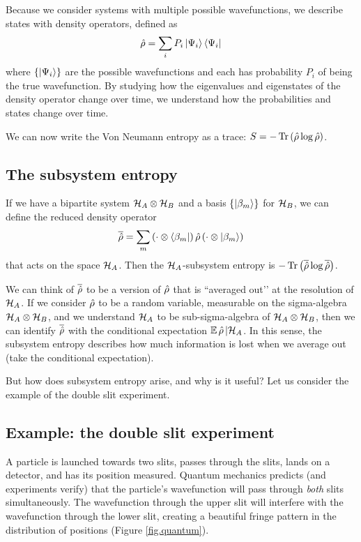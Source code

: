 Because we consider systems with multiple possible wavefunctions, we describe states with density operators, defined as
\[
\hat{\rho} = \sum_i P_i \left|\Psi_i\right\rangle\left\langle\Psi_i\right|
\]
where \(\{\left|\Psi_i\right\rangle\}\) are the possible wavefunctions and each has probability \(P_i\) of being the true wavefunction. By studying how the eigenvalues and eigenstates of the density operator change over time, we understand how the probabilities and states change over time.

We can now write the Von Neumann entropy as a trace: \(S = -\operatorname{Tr}\left(\hat{\rho} \log \hat{\rho}\right)\).

\subsection{The subsystem entropy}

If we have a bipartite system \(\mathcal{H}_A \otimes \mathcal{H}_B\) and a basis \(\{\left|\beta_m\right\rangle\}\) for \(\mathcal{H}_B\), we can define the reduced density operator
\[
\overline{\hat{\rho}} = \sum_m \left(\cdot \otimes \left\langle\beta_m\right|\right) \hat{\rho} \left(\cdot \otimes \left|\beta_m\right\rangle\right)
\]
that acts on the space \(\mathcal{H}_A\). Then the \(\mathcal{H}_A\)-subsystem entropy is \(-\operatorname{Tr}\left(\overline{\hat{\rho}}\log \overline{\hat{\rho}}\right)\).

We can think of \(\overline{\hat{\rho}}\) to be a version of \(\hat{\rho}\) that is ``averaged out’’ at the resolution of \(\mathcal{H}_A\). If we consider \(\hat{\rho}\) to be a random variable, measurable on the sigma-algebra \(\mathcal{H}_A \otimes \mathcal{H}_B\), and we understand \(\mathcal{H}_A\) to be sub-sigma-algebra of \(\mathcal{H}_A \otimes \mathcal{H}_B\), then we can identify \(\overline{\hat{\rho}}\) with the conditional expectation \(\mathbb{E}\, \hat{\rho} \,| \mathcal{H}_A\). In this sense, the subsystem entropy describes how much information is lost when we average out (take the conditional expectation).

But how does subsystem entropy arise, and why is it useful? Let us consider the example of the double slit experiment.

\subsection{Example: the double slit experiment}\label{sec.doubleslit}

A particle is launched towards two slits, passes through the slits, lands on a detector, and has its position measured. Quantum mechanics predicts (and experiments verify) that the particle’s wavefunction will pass through \emph{both} slits simultaneously. The wavefunction through the upper slit will interfere with the wavefunction through the lower slit, creating a beautiful fringe pattern in the distribution of positions (Figure \ref{fig.quantum}).

